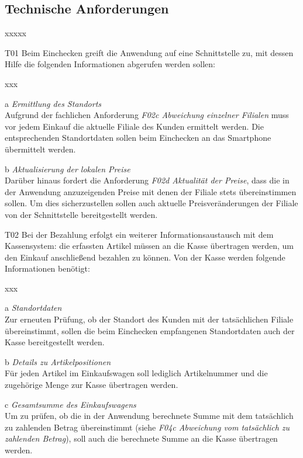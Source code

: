 \subsection{Technische Anforderungen}\label{anforderungen-technisch}

\label{anforderung:einchecken}
\begin{seToplist}{xxxxx}
	\item[T01]Beim Einchecken greift die Anwendung auf eine Schnittstelle zu, mit dessen Hilfe die folgenden Informationen abgerufen werden sollen:
	\begin{seToplist}{xxx}
		\item[a]\textit{Ermittlung des Standorts}\\
		Aufgrund der fachlichen Anforderung \textit{F02c Abweichung einzelner Filialen} muss vor jedem Einkauf die aktuelle Filiale des Kunden ermittelt werden. Die entsprechenden Standortdaten sollen beim Einchecken an das Smartphone übermittelt werden.
		\item[b]\textit{Aktualisierung der lokalen Preise}\\
		Darüber hinaus fordert die Anforderung \textit{F02d Aktualität der Preise}, dass die in der Anwendung anzuzeigenden Preise mit denen der Filiale stets übereinstimmen sollen. Um dies sicherzustellen sollen auch aktuelle Preisveränderungen der Filiale von der Schnittstelle bereitgestellt werden.
	\end{seToplist}
	\item[T02]\label{anforderung:kasse}Bei der Bezahlung erfolgt ein weiterer Informationsaustausch mit dem Kassensystem: die erfassten Artikel müssen an die Kasse übertragen werden, um den Einkauf anschließend bezahlen zu können. Von der Kasse werden folgende Informationen benötigt:
	\begin{seToplist}{xxx}
		\item[a]\textit{Standortdaten}\\
		Zur erneuten Prüfung, ob der Standort des Kunden mit der tatsächlichen Filiale übereinstimmt, sollen die beim Einchecken empfangenen Standortdaten auch der Kasse bereitgestellt werden.
		\item[b]\textit{Details zu Artikelpositionen}\\
		Für jeden Artikel im Einkaufswagen soll lediglich Artikelnummer und die zugehörige Menge zur Kasse übertragen werden.
		\item[c]\textit{Gesamtsumme des Einkaufswagens}\\
		Um zu prüfen, ob die in der Anwendung berechnete Summe mit dem tatsächlich zu zahlenden Betrag übereinstimmt (siehe \textit{F04c Abweichung vom tatsächlich zu zahlenden Betrag}), soll auch die berechnete Summe an die Kasse übertragen werden.

\end{seToplist}
\end{seToplist}

